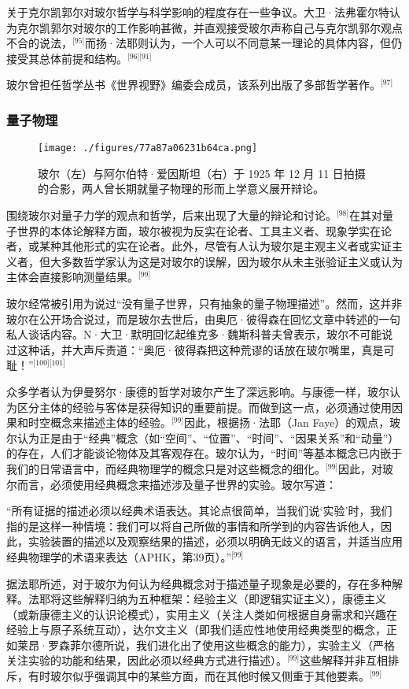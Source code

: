 关于克尔凯郭尔对玻尔哲学与科学影响的程度存在一些争议。大卫·法弗霍尔特认为克尔凯郭尔对玻尔的工作影响甚微，并直观接受玻尔声称自己与克尔凯郭尔观点不合的说法，\(^\text{[95]}\)而扬·法耶则认为，一个人可以不同意某一理论的具体内容，但仍接受其总体前提和结构。\(^\text{[96][91]}\)

玻尔曾担任哲学丛书《世界视野》编委会成员，该系列出版了多部哲学著作。\(^\text{[97]}\)
\subsubsection{量子物理}
\begin{figure}[ht]
\centering
\texttt{[image: ./figures/77a87a06231b64ca.png]}
\caption{玻尔（左）与阿尔伯特·爱因斯坦（右）于 1925 年 12 月 11 日拍摄的合影，两人曾长期就量子物理的形而上学意义展开辩论。} \label{fig_NRSbr_8}
\end{figure}
围绕玻尔对量子力学的观点和哲学，后来出现了大量的辩论和讨论。\(^\text{[98]}\)在其对量子世界的本体论解释方面，玻尔被视为反实在论者、工具主义者、现象学实在论者，或某种其他形式的实在论者。此外，尽管有人认为玻尔是主观主义者或实证主义者，但大多数哲学家认为这是对玻尔的误解，因为玻尔从未主张验证主义或认为主体会直接影响测量结果。\(^\text{[99]}\)

玻尔经常被引用为说过“没有量子世界，只有抽象的量子物理描述”。然而，这并非玻尔在公开场合说过，而是玻尔去世后，由奥厄·彼得森在回忆文章中转述的一句私人谈话内容。N·大卫·默明回忆起维克多·魏斯科普夫曾表示，玻尔不可能说过这种话，并大声斥责道：“奥厄·彼得森把这种荒谬的话放在玻尔嘴里，真是可耻！”\(^\text{[100][101]}\)

众多学者认为伊曼努尔·康德的哲学对玻尔产生了深远影响。与康德一样，玻尔认为区分主体的经验与客体是获得知识的重要前提。而做到这一点，必须通过使用因果和时空概念来描述主体的经验。\(^\text{[99]}\)因此，根据扬·法耶（Jan Faye）的观点，玻尔认为正是由于“经典”概念（如“空间”、“位置”、“时间”、“因果关系”和“动量”）的存在，人们才能谈论物体及其客观存在。玻尔认为，“时间”等基本概念已内嵌于我们的日常语言中，而经典物理学的概念只是对这些概念的细化。\(^\text{[99]}\)因此，对玻尔而言，必须使用经典概念来描述涉及量子世界的实验。玻尔写道：

“所有证据的描述必须以经典术语表达。其论点很简单，当我们说‘实验’时，我们指的是这样一种情境：我们可以将自己所做的事情和所学到的内容告诉他人，因此，实验装置的描述以及观察结果的描述，必须以明确无歧义的语言，并适当应用经典物理学的术语来表达（APHK，第39页）。”\(^\text{[99]}\)

据法耶所述，对于玻尔为何认为经典概念对于描述量子现象是必要的，存在多种解释。法耶将这些解释归纳为五种框架：经验主义（即逻辑实证主义），康德主义（或新康德主义的认识论模式），实用主义（关注人类如何根据自身需求和兴趣在经验上与原子系统互动），达尔文主义（即我们适应性地使用经典类型的概念，正如莱昂·罗森菲尔德所说，我们进化出了使用这些概念的能力），实验主义（严格关注实验的功能和结果，因此必须以经典方式进行描述）。\(^\text{[99]}\)这些解释并非互相排斥，有时玻尔似乎强调其中的某些方面，而在其他时候又侧重于其他要素。\(^\text{[99]}\)

